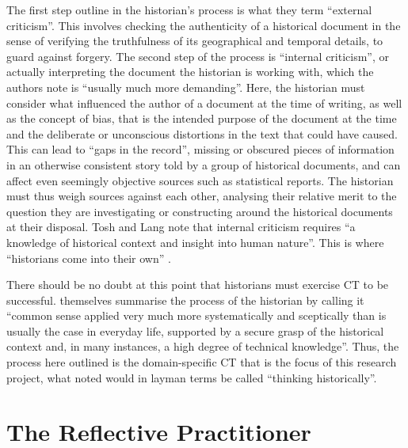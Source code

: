 \documentclass{l4proj}
\begin{document}
The first step \citet{tosh2006pursuit} outline in the historian’s process is what they term “external criticism”. This involves checking the authenticity of a historical document in the sense of verifying the truthfulness of its geographical and temporal details, to guard against forgery. The second step of the process is “internal criticism”, or actually interpreting the document the historian is working with, which the authors note is “usually much more demanding”. Here, the historian must consider what influenced the author of a document at the time of writing, as well as the concept of bias, that is the intended purpose of the document at the time and the deliberate or unconscious distortions in the text that could have caused. This can lead to “gaps in the record”, missing or obscured pieces of information in an otherwise consistent story told by a group of historical documents, and can affect even seemingly objective sources such as statistical reports. The historian must thus weigh sources against each other, analysing their relative merit to the question they are investigating or constructing around the historical documents at their disposal. Tosh and Lang note that internal criticism requires “a knowledge of historical context and insight into human nature”. This is where “historians come into their own” \citep{tosh2006pursuit}. 

There should be no doubt at this point that historians must exercise CT to be successful. \citet{tosh2006pursuit} themselves summarise the process of the historian by calling it “common sense applied very much more systematically and sceptically than is usually the case in everyday life, supported by a secure grasp of the historical context and, in many instances, a high degree of technical knowledge”. Thus, the process here outlined is the domain-specific CT that is the focus of this research project, what \citet{willingham2008critical} noted would in layman terms be called “thinking historically”. 

\section{The Reflective Practitioner}
\end{document}
